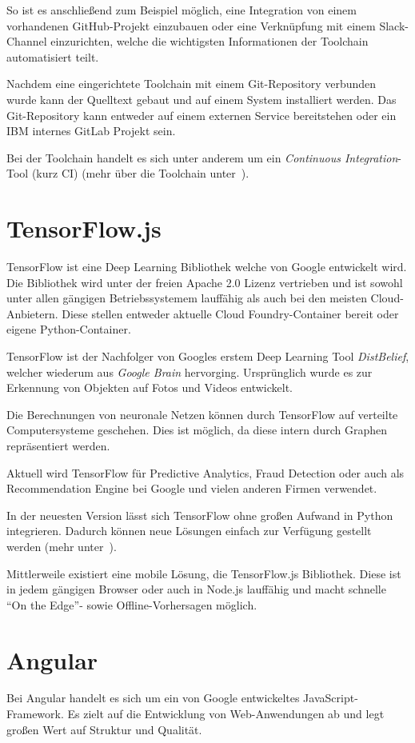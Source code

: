 So ist es anschließend zum Beispiel möglich, eine Integration von einem vorhandenen GitHub-Projekt einzubauen oder eine
Verknüpfung mit einem Slack-Channel einzurichten, welche die wichtigsten Informationen der Toolchain automatisiert teilt.

Nachdem eine eingerichtete Toolchain mit einem Git-Repository verbunden wurde kann der Quelltext gebaut und auf einem
System installiert werden. Das Git-Repository kann entweder auf einem externen Service bereitstehen oder ein IBM internes
GitLab Projekt sein.

Bei der Toolchain handelt es sich unter anderem um ein \textit{Continuous Integration}-Tool (kurz CI)
(mehr über die Toolchain unter~\cite{online_grundlagen_toolchain}).

\section{TensorFlow.js}
TensorFlow ist eine Deep Learning Bibliothek welche von Google entwickelt wird. Die Bibliothek wird unter der freien
Apache 2.0 Lizenz vertrieben und ist sowohl unter allen gängigen Betriebssystemem lauffähig als auch bei den meisten
Cloud-Anbietern. Diese stellen entweder aktuelle Cloud Foundry-Container bereit oder eigene Python-Container.

TensorFlow ist der Nachfolger von Googles erstem Deep Learning Tool \textit{DistBelief}, welcher wiederum aus
\textit{Google Brain} hervorging. Ursprünglich wurde es zur Erkennung von Objekten auf Fotos und Videos entwickelt.

Die Berechnungen von neuronale Netzen können durch TensorFlow auf verteilte Computersysteme geschehen. Dies ist möglich,
da diese intern durch Graphen repräsentiert werden.

Aktuell wird TensorFlow für Predictive Analytics, Fraud Detection oder auch als Recommendation Engine bei Google und
vielen anderen Firmen verwendet.

In der neuesten Version lässt sich TensorFlow ohne großen Aufwand in Python integrieren. Dadurch können neue Lösungen
einfach zur Verfügung gestellt werden (mehr unter~\cite{book_grundlagen_tensorflow}).

Mittlerweile existiert eine mobile Lösung, die TensorFlow.js Bibliothek. Diese ist in jedem gängigen Browser oder auch
in Node.js lauffähig und macht schnelle \enquote{On the Edge}- sowie Offline-Vorhersagen möglich.

\section{Angular}
Bei Angular handelt es sich um ein von Google entwickeltes JavaScript-Framework. Es zielt auf die Entwicklung von
Web-Anwendungen ab und legt großen Wert auf Struktur und Qualität.

